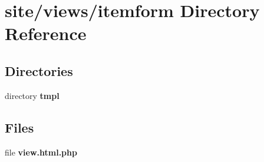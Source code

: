 \section{site/views/itemform Directory Reference}
\label{dir_21cdd245e7d924e933d1908e9fd7a7f2}
\subsection*{Directories}
\begin{DoxyCompactItemize}
\item 
directory \textbf{ tmpl}
\end{DoxyCompactItemize}
\subsection*{Files}
\begin{DoxyCompactItemize}
\item 
file \textbf{ view.\+html.\+php}
\end{DoxyCompactItemize}
